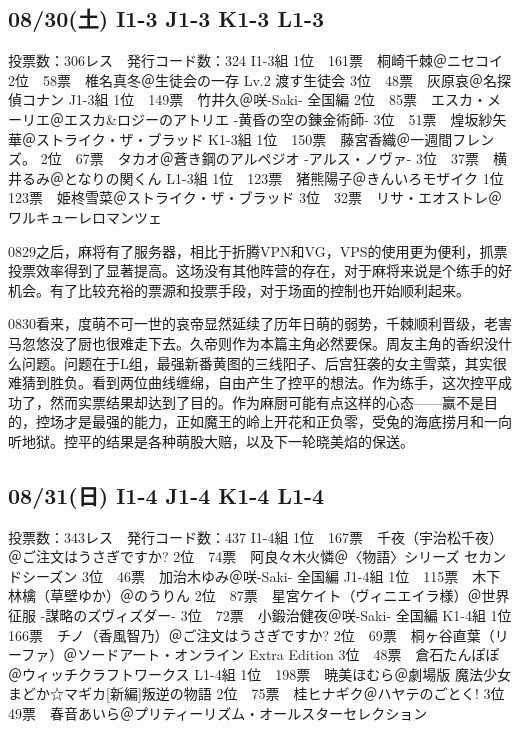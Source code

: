 \subsection{08/30(土) I1-3 J1-3 K1-3 L1-3}

	投票数：306レス　発行コード数：324
	I1-3組
	1位　161票　桐崎千棘＠ニセコイ
	2位　58票　椎名真冬＠生徒会の一存 Lv.2 渡す生徒会
	3位　48票　灰原哀＠名探偵コナン
	J1-3組
	1位　149票　竹井久＠咲-Saki- 全国編
	2位　85票　エスカ・メーリエ＠エスカ\&ロジーのアトリエ -黄昏の空の錬金術師-
	3位　51票　煌坂紗矢華＠ストライク・ザ・ブラッド
	K1-3組
	1位　150票　藤宮香織＠一週間フレンズ。
	2位　67票　タカオ＠蒼き鋼のアルペジオ -アルス・ノヴァ-
	3位　37票　横井るみ＠となりの関くん
	L1-3組
	1位　123票　猪熊陽子＠きんいろモザイク
	1位　123票　姫柊雪菜＠ストライク・ザ・ブラッド
	3位　32票　リサ・エオストレ＠ワルキューレロマンツェ

0829之后，麻将有了服务器，相比于折腾VPN和VG，VPS的使用更为便利，抓票投票效率得到了显著提高。这场没有其他阵营的存在，对于麻将来说是个练手的好机会。有了比较充裕的票源和投票手段，对于场面的控制也开始顺利起来。

0830看来，度萌不可一世的哀帝显然延续了历年日萌的弱势，千棘顺利晋级，老害马忽悠没了厨也很难走下去。久帝则作为本篇主角必然要保。周友主角的香织没什么问题。问题在于L组，最强新番黄图的三线阳子、后宫狂袭的女主雪菜，其实很难猜到胜负。看到两位曲线缠绵，自由产生了控平的想法。作为练手，这次控平成功了，然而实票结果却达到了目的。作为麻厨可能有点这样的心态——赢不是目的，控场才是最强的能力，正如魔王的岭上开花和正负零，受兔的海底捞月和一向听地狱。控平的结果是各种萌股大赔，以及下一轮晓美焰的保送。

\subsection{08/31(日) I1-4 J1-4 K1-4 L1-4}

	投票数：343レス　発行コード数：437
	I1-4組
	1位　167票　千夜（宇治松千夜）＠ご注文はうさぎですか?
	2位　74票　阿良々木火憐＠〈物語〉シリーズ セカンドシーズン
	3位　46票　加治木ゆみ＠咲-Saki- 全国編
	J1-4組
	1位　115票　木下林檎（草壁ゆか）＠のうりん
	2位　87票　星宮ケイト（ヴィニエイラ様）＠世界征服 -謀略のズヴィズダー-
	3位　72票　小鍛治健夜＠咲-Saki- 全国編
	K1-4組
	1位　166票　チノ（香風智乃）＠ご注文はうさぎですか?
	2位　69票　桐ヶ谷直葉（リーファ）＠ソードアート・オンライン Extra Edition
	3位　48票　倉石たんぽぽ＠ウィッチクラフトワークス
	L1-4組
	1位　198票　暁美ほむら＠劇場版 魔法少女まどか☆マギカ[新編]叛逆の物語
	2位　75票　桂ヒナギク＠ハヤテのごとく!
	3位　49票　春音あいら＠プリティーリズム・オールスターセレクション

